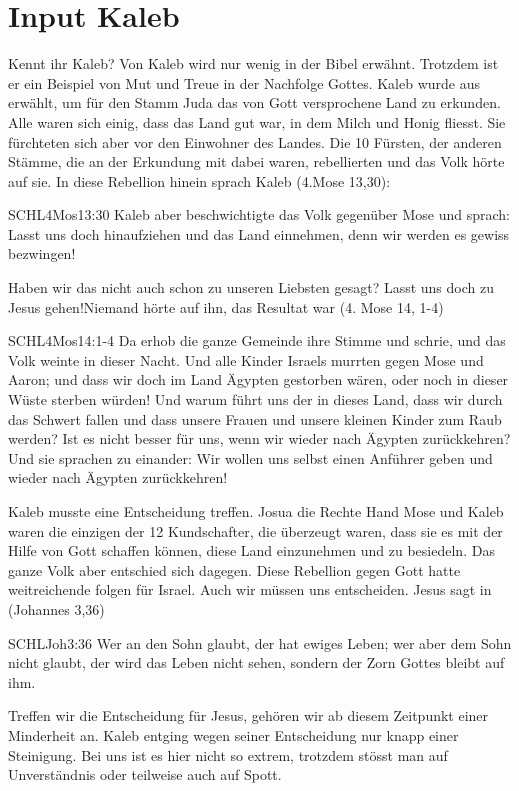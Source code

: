 \documentclass{../inc/mybib}
\begin{document}
\section{Input Kaleb}
Kennt ihr Kaleb?
Von Kaleb wird nur wenig in der Bibel erwähnt. Trotzdem ist er ein Beispiel von Mut und Treue in der Nachfolge Gottes. Kaleb wurde aus erwählt, um für den Stamm Juda das von Gott versprochene Land zu erkunden. Alle waren sich einig, dass das Land gut war, in dem Milch und Honig fliesst. Sie fürchteten sich aber vor den Einwohner des Landes. Die 10 Fürsten, der anderen Stämme, die an der Erkundung mit dabei waren, rebellierten und das Volk hörte auf sie. In diese Rebellion hinein sprach Kaleb (4.Mose 13,30):
\begin{bibelbox}{SCHL}{4Mos}{13:30}
Kaleb aber beschwichtigte das Volk gegenüber Mose und sprach: \glqq{}Lasst uns doch hinaufziehen und das Land einnehmen, denn wir werden es gewiss bezwingen!\grqq
\end{bibelbox}
Haben wir das nicht auch schon zu unseren Liebsten gesagt? \glqq{}Lasst uns doch zu Jesus gehen!\grqq Niemand hörte auf ihn, das Resultat war (4. Mose 14, 1-4)
\begin{bibelbox}{SCHL}{4Mos}{14:1-4}
Da erhob die ganze Gemeinde ihre Stimme und schrie, und das Volk weinte in dieser Nacht. Und alle Kinder Israels murrten gegen Mose und Aaron; und dass wir doch im Land Ägypten gestorben wären, oder noch in dieser Wüste sterben würden! Und warum führt uns der \herr{} in dieses Land, dass wir durch das Schwert fallen und dass unsere Frauen und unsere kleinen Kinder zum Raub werden? Ist es nicht besser für uns, wenn wir wieder nach Ägypten zurückkehren? Und sie sprachen zu einander: \glqq{}Wir wollen uns selbst einen Anführer geben und wieder nach Ägypten zurückkehren!\grqq
\end{bibelbox}
Kaleb musste eine Entscheidung treffen. Josua die Rechte Hand Mose und Kaleb waren die einzigen der 12 Kundschafter, die überzeugt waren, dass sie es mit der Hilfe von Gott schaffen können, diese Land einzunehmen und zu besiedeln. Das ganze Volk aber entschied sich dagegen. Diese Rebellion gegen Gott hatte weitreichende folgen für Israel.
Auch wir müssen uns entscheiden. Jesus sagt in (Johannes 3,36)
\begin{bibelbox}{SCHL}{Joh}{3:36}
Wer an den Sohn glaubt, der hat ewiges Leben; wer aber dem Sohn nicht glaubt, der wird das Leben nicht sehen, sondern der Zorn Gottes bleibt auf ihm.
\end{bibelbox}
Treffen wir die Entscheidung für Jesus, gehören wir ab diesem Zeitpunkt einer Minderheit an. Kaleb entging wegen seiner Entscheidung nur knapp einer Steinigung. Bei uns ist es hier nicht so extrem, trotzdem stösst man auf Unverständnis oder teilweise auch auf Spott.
\end{document}
